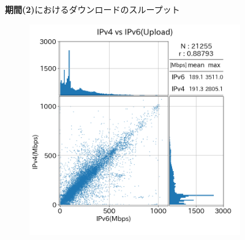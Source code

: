 \begin{figure}[htbp]
\begin{center}
\begin{subfigure}[b]{0.49\textwidth}
            \label{new_diffISP_dl}
        \end{subfigure}
        \caption{{\bf 期間(2)}におけるダウンロードのスループット}
        \label{fig:new_isp_dl}
    \end{center}
\end{figure}
\FloatBarrier

\begin{figure}[htbp]
    \begin{center}
        \begin{subfigure}[b]{0.49\textwidth}
            \centering
            \includegraphics[width=1.0\textwidth]{fig/old_sameISP_ul.png}
            \label{old_sameISP_ul}
        \end{subfigure}
        \begin{subfigure}[b]{0.49\textwidth}
            \centering

\end{subfigure}
\end{center}
\end{figure}
